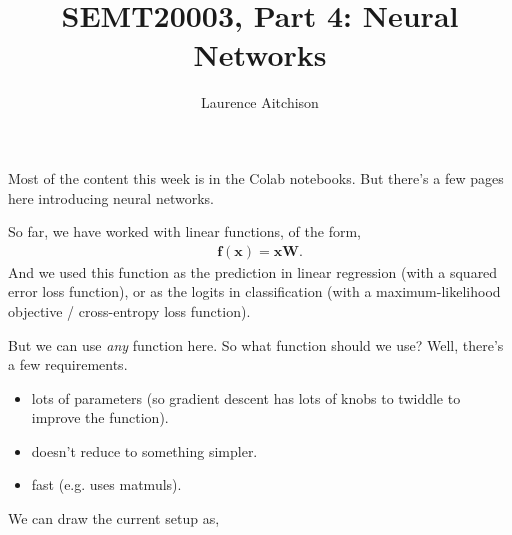 \documentclass{article}
\title{SEMT20003, Part 4: Neural Networks}
\author{Laurence Aitchison}
\date{}
\newcommand{\x}{\mathbf{x}}
\newcommand{\y}{\mathbf{y}}
\newcommand{\f}{\mathbf{f}}
\newcommand{\W}{\mathbf{W}}
\begin{document}
\maketitle

Most of the content this week is in the Colab notebooks.  But there's a few pages here introducing neural networks.

So far, we have worked with linear functions, of the form,
\begin{align}
  \f(\x) = \x\W.
\end{align}
And we used this function as the prediction in linear regression (with a squared error loss function), or as the logits in classification (with a maximum-likelihood objective / cross-entropy loss function).

But we can use \textit{any} function here.
So what function should we use?
Well, there's a few requirements.
\begin{itemize}
  \item lots of parameters (so gradient descent has lots of knobs to twiddle to improve the function).      
  \item doesn't reduce to something simpler.
  \item fast (e.g. uses matmuls).
\end{itemize}

We can draw the current setup as,

\begin{center}
\end{center}
\end{document}

